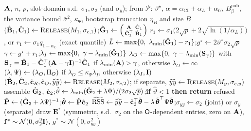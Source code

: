 \begin{algorithm}[p]
\caption{\textsc{Solve} and \textsc{Infer} ($\Rp$, Phase~5)}
\label{alg:solve}
\small
\begin{algorithmic}[1]
\Require $\mathbf{A}$, $n$, $p$, slot-domain s.d.\ $\sigma_1,\sigma_2$ (and $\sigma_y$); from $\mathcal P$: $\vartheta^\star$, $\alpha=\alpha_{\mathrm{CI}}+\alpha_L+\alpha_U$, $B_\beta^{\mathrm{pub}}$, the variance bound $\bar\sigma^2$, $\kappa_\Psi$, bootstrap truncation $\eta_B$ and size $B$
\State $(\hat{\mathbf{B}}_1,\hat{\mathbf{C}}_1)\gets\textsc{Release}(M_1,\sigma_{c,1})$;\quad $\hat{\mathbf{G}}_1\gets\begin{psmallmatrix}\mathbf{A}&\hat{\mathbf{C}}_1\\ \hat{\mathbf{C}}_1^\top&\hat{\mathbf{B}}_1\end{psmallmatrix}$
\State $r_1\gets\sigma_1\bigl(2\sqrt p+2\sqrt{\ln(1/\alpha_L)}\bigr)$, or $r_1\gets\sigma_1q_{1-\alpha_L}$ (exact quantile) 
\State $\hat L\gets\max\{0,\ \lambda_{\min}(\hat\bG_1)-r_1\}$;\quad $g^\star\gets2\vartheta^\star\sigma_2\sqrt p$
\State $\gamma\gets g^\star+r_1$;\quad $\lambda_I\gets\max\{0,\ \gamma-\lambda_{\min}(\hat\bG_1)\}$
\State $\lambda_O\gets\max\{0,\ \gamma-\lambda_{\min}(\bS_\gamma)\}$ with $\mathbf{S}_\gamma=\hat{\mathbf{B}}_1-\hat{\mathbf{C}}_1^\top(\mathbf{A}-\gamma\mathbf{I})^{-1}\hat{\mathbf{C}}_1$ if $\lambda_{\min}(\mathbf{A})>\gamma$, otherwise $\lambda_O\gets\infty$ 
\State $(\lambda,\Psi)\gets(\lambda_O,\Pi_{O})$ if $\lambda_O\le\kappa_\Psi\lambda_I$, otherwise $(\lambda_I,\mathbf{I})$ 
\State $(\hat{\mathbf{B}}_2,\hat{\mathbf{C}}_2,\hat{\mathbf{c}}_R,\hat{\mathbf{c}}_O,\widehat{yy})\gets\textsc{Release}(M_2,\sigma_{c,2})$; if separate, $\widehat{yy}\gets\textsc{Release}(M_y,\sigma_{c,y})$
\State assemble $\hat{\mathbf{G}}_2$, $\hat{\mathbf{c}}_2$;\quad $\hat\vartheta\gets\lambda_{\min}(\hat{\mathbf{G}}_2+\lambda\Psi)/(2\sigma_2\sqrt p)$;\quad \textbf{if} $\hat\vartheta<1$ \textbf{then return} \textsf{refused} 
\State $\tilde{\mathbf{P}}\gets(\hat{\mathbf{G}}_2+\lambda\Psi)^{-1}$;\quad $\tilde{\boldsymbol{\theta}}\gets\tilde{\mathbf{P}}\hat{\mathbf{c}}_2$ 
\State $\widetilde{\mathrm{RSS}}\gets\widehat{yy}-\hat{\mathbf{c}}_2^\top\tilde{\boldsymbol{\theta}}-\lambda\,\tilde{\boldsymbol{\theta}}^\top\Psi\tilde{\boldsymbol{\theta}}$;\quad $\sigma_{yy}\gets\sigma_2$ (joint) or $\sigma_y$ (separate)
 
  \State draw $\mathbf E^*$ (symmetric, s.d.\ $\sigma_2$ on the $\textsf{O}$-dependent entries, zero on $\mathbf{A}$), $\mathbf f^*\sim\mathcal N(0,\sigma_2^2\mathbf{I})$, $g^*\sim\mathcal N(0,\sigma_{yy}^2)$

\end{algorithmic}
\end{algorithm}

